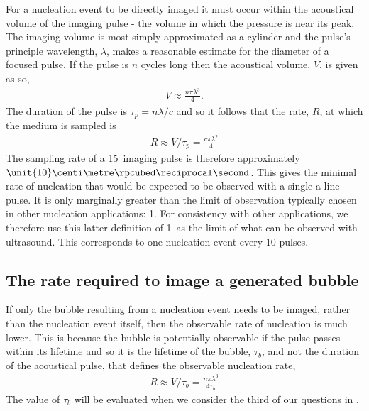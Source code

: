 For a nucleation event to be directly imaged
it must occur within the acoustical volume of the imaging pulse -
the volume in which the pressure is near its peak.
%
The imaging volume is most simply approximated as a cylinder
and the pulse's principle wavelength, $\lambda$, makes a reasonable estimate for the diameter of a focused pulse.
If the pulse is $n$ cycles long then the acoustical volume, $V$, is given as so,
\begin{align}
  V \approx \frac{n  \pi \lambda^3 }{ 4}.
\end{align}
The duration of the pulse is $\tau_p=n\lambda/c$ and so it follows that the rate, $R$, at which the medium is sampled is 
\begin{align}
R \approx V/\tau_p = \frac{c\pi\lambda^2 }{4}
\label{eqn:nuc:rateOne}
\end{align}
The sampling rate of a \unit{15}\mega\hertz\ imaging pulse is therefore approximately
$\unit{10}\centi\metre\rpcubed\reciprocal\second$.
This gives the minimal rate of nucleation that would  be expected to be observed with a single a-line pulse.
It is only marginally greater than the limit of observation typically chosen in other nucleation applications: \unit{1}\centi\metre\rpcubed\reciprocal\second{}.
For consistency with other applications, we therefore use this latter definition of  \unit{1}\centi\metre\rpcubed\reciprocal\second\
as the limit of what can be observed with ultrasound.
This corresponds to one nucleation event every 10 pulses.



\subsection{The rate required to image a generated bubble}

If only the bubble resulting from a nucleation event needs to be imaged, rather than the nucleation event itself, 
then the observable rate of nucleation is much lower.
This is because the bubble is potentially observable if the pulse passes within its lifetime 
and so it is the lifetime of the bubble, $\tau_b$, and not the duration of the acoustical pulse,
that defines the observable nucleation rate,
\begin{align}
R\approx V/\tau_b = \frac{n\pi\lambda^3}{4\tau_b}
\label{eqn:observable_rate_lifetime}
\end{align}
The value of $\tau_b$ will be evaluated when we consider the third of our questions in  .



